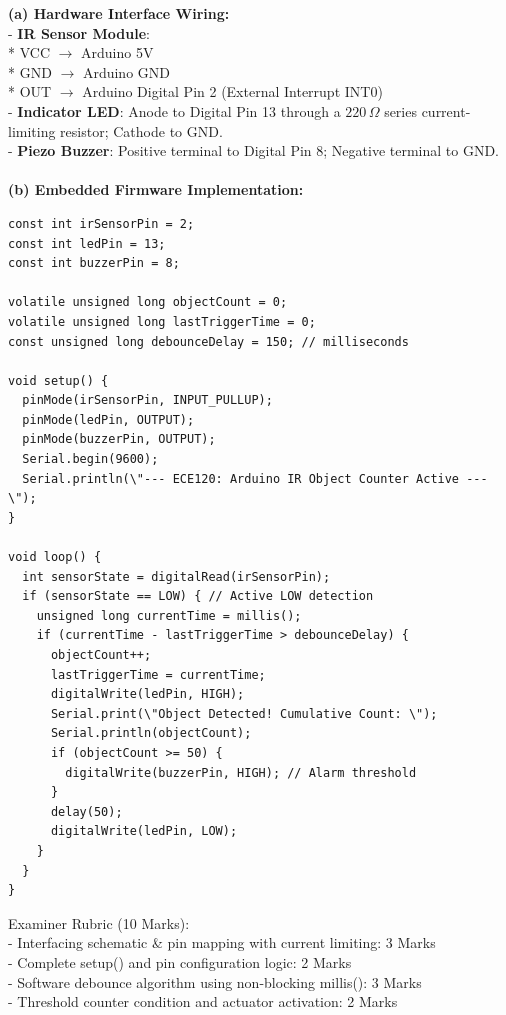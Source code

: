 \begin{solbox}
\textbf{(a) Hardware Interface Wiring:}\\
- \textbf{IR Sensor Module}:\\
  * VCC $\to$ Arduino 5V\\
  * GND $\to$ Arduino GND\\
  * OUT $\to$ Arduino Digital Pin 2 (External Interrupt INT0)\\
- \textbf{Indicator LED}: Anode to Digital Pin 13 through a $220\,\Omega$ series current-limiting resistor; Cathode to GND.\\
- \textbf{Piezo Buzzer}: Positive terminal to Digital Pin 8; Negative terminal to GND.\\\\
\textbf{(b) Embedded Firmware Implementation:}\\
\begin{verbatim}
const int irSensorPin = 2;
const int ledPin = 13;
const int buzzerPin = 8;

volatile unsigned long objectCount = 0;
volatile unsigned long lastTriggerTime = 0;
const unsigned long debounceDelay = 150; // milliseconds

void setup() {
  pinMode(irSensorPin, INPUT_PULLUP);
  pinMode(ledPin, OUTPUT);
  pinMode(buzzerPin, OUTPUT);
  Serial.begin(9600);
  Serial.println(\"--- ECE120: Arduino IR Object Counter Active ---\");
}

void loop() {
  int sensorState = digitalRead(irSensorPin);
  if (sensorState == LOW) { // Active LOW detection
    unsigned long currentTime = millis();
    if (currentTime - lastTriggerTime > debounceDelay) {
      objectCount++;
      lastTriggerTime = currentTime;
      digitalWrite(ledPin, HIGH);
      Serial.print(\"Object Detected! Cumulative Count: \");
      Serial.println(objectCount);
      if (objectCount >= 50) {
        digitalWrite(buzzerPin, HIGH); // Alarm threshold
      }
      delay(50);
      digitalWrite(ledPin, LOW);
    }
  }
}
\end{verbatim}
\end{solbox}

\begin{examinertip}
Examiner Rubric (10 Marks):\\
- Interfacing schematic \& pin mapping with current limiting: 3 Marks\\
- Complete setup() and pin configuration logic: 2 Marks\\
- Software debounce algorithm using non-blocking millis(): 3 Marks\\
- Threshold counter condition and actuator activation: 2 Marks
\end{examinertip}


